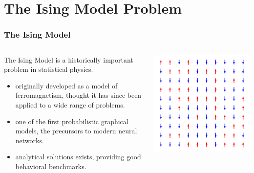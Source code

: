 \documentclass[aspectratio=169, 12pt]{beamer}
\begin{document}
\section{The Ising Model Problem}

\begin{frame}
    \frametitle{The Ising Model}

    \begin{columns}
        \begin{column}{.6\textwidth}
            
            The Ising Model is a historically important problem in statistical physics. 

            \begin{itemize}
                \item originally developed as a model of ferromagnetism, thought it has since been applied to a wide range of problems. 
                \item one of the first probabilistic graphical models, the precursors to modern neural networks. 
                \item analytical solutions exists, providing good behavioral benchmarks. 
            \end{itemize}
            
        \end{column}
        \begin{column}{.4\textwidth}
            \includegraphics[width=\textwidth]{images/ising-spins.png}
        \end{column}
    \end{columns}
\end{frame}
\end{document}
